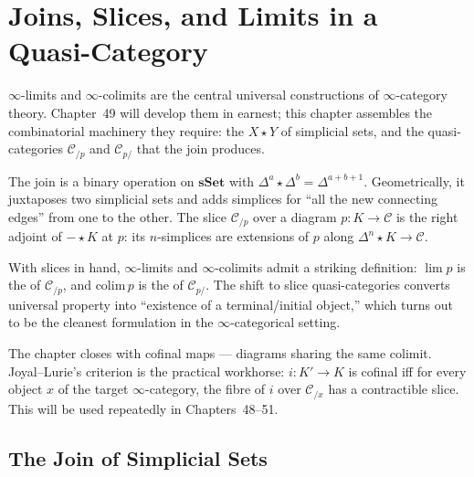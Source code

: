 
\chapter{Joins, Slices, and Limits in a Quasi-Category}

\begin{overviewbox}
$\infty$-limits and $\infty$-colimits are the central universal
constructions of $\infty$-category theory. Chapter~49 will develop them
in earnest; this chapter assembles the combinatorial machinery they
require: the  $X \star Y$ of simplicial sets, and the
 quasi-categories $\mathcal{C}_{/p}$ and $\mathcal{C}_{p/}$
that the join produces.

The join is a binary operation on $\mathbf{sSet}$ with $\Delta^a \star
\Delta^b = \Delta^{a + b + 1}$. Geometrically, it juxtaposes two
simplicial sets and adds simplices for ``all the new connecting
edges'' from one to the other. The slice $\mathcal{C}_{/p}$ over a
diagram $p : K \to \mathcal{C}$ is the right adjoint of $- \star K$ at
$p$: its $n$-simplices are extensions of $p$ along $\Delta^n \star K
\to \mathcal{C}$.

With slices in hand, $\infty$-limits and $\infty$-colimits admit a
striking definition: $\lim p$ is the  of
$\mathcal{C}_{/p}$, and $\mathrm{colim}\, p$ is the 
of $\mathcal{C}_{p/}$. The shift to slice quasi-categories converts
universal property into ``existence of a terminal/initial object,'' which
turns out to be the cleanest formulation in the $\infty$-categorical
setting.

The chapter closes with cofinal maps — diagrams sharing the same
colimit. Joyal–Lurie's criterion is the practical workhorse:
$i : K' \to K$ is cofinal iff for every object $x$ of the target
$\infty$-category, the fibre of $i$ over $\mathcal{C}_{/x}$ has a
contractible slice. This will be used repeatedly in Chapters~48--51.
\end{overviewbox}


\section{The Join of Simplicial Sets}
\label{sec:join}

